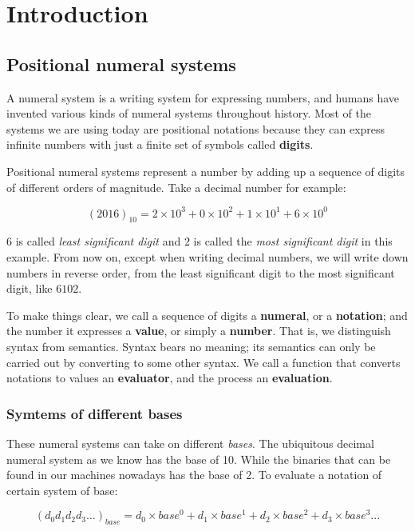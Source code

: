 \documentclass[../thesis.tex]{subfiles}
\begin{document}
\chapter{Introduction}\label{introduction}

\section{Positional numeral systems}

A numeral system is a writing system for expressing numbers, and humans have
invented various kinds of numeral systems throughout history. Most of the
systems we are using today are positional notations\cite{knuth1998art} because
they can express infinite numbers with just a finite set of symbols called
\textbf{digits}.

Positional numeral systems represent a number by adding up a sequence of digits
of different orders of magnitude. Take a decimal number for example:

$$ (2016)_{10} = 2\times10^3 + 0\times10^2 + 1\times10^1 + 6\times10^0 $$

$ 6 $ is called \textit{least significant digit} and $ 2 $ is called the
\textit{most significant digit} in this example. From now on, except when writing
decimal numbers, we will write down numbers in reverse order, from the least
significant digit to the most significant digit, like $ 6102 $.

To make things clear, we call a sequence of digits a \textbf{numeral}, or a \textbf{notation};
and the number it expresses a \textbf{value}, or simply a \textbf{number}. That is,
we distinguish syntax from semantics. Syntax bears no meaning; its semantics can
only be carried out by converting to some other syntax. We call a function that
converts notations to values an \textbf{evaluator}, and the process an
\textbf{evaluation}.

\subsection{Symtems of different bases}

These numeral systems can take on different \textit{bases}. The ubiquitous decimal
numeral system as we know has the base of 10. While the binaries that can be found
in our machines nowadays has the base of 2. To evaluate a notation of certain
system of base:

$$
    ({d_0d_1d_2d_3...})_{base}
    =
    d_0\times base^0 + d_1\times base^1 + d_2\times base^2 + d_3\times base^3 ...
$$
\end{document}
